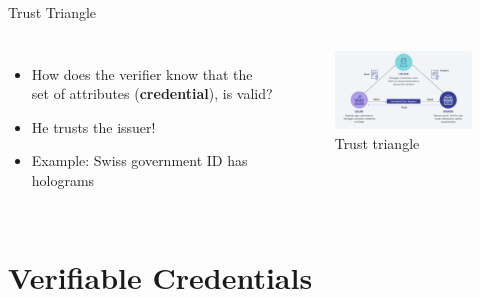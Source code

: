 \documentclass[
	english,%
	authorontitle=true,
	]{bfhbeamer}
\begin{document}
\begin{frame}{Trust Triangle}
    \begin{columns}[onlytextwidth,T]
        \column{70mm}  
        
        \begin{itemize}
            \item How does the verifier know that the set of attributes (\textbf{credential}), is valid?
            \item He trusts the issuer!
            \item Example: Swiss government ID has holograms
        \end{itemize}

        \column{70mm}

        \begin{figure}
            \centering
            \includegraphics[width=70mm]{./img/trusttriangle.png}
            \caption{Trust triangle}
        \end{figure}
        
    \end{columns}
\end{frame}

\section{Verifiable Credentials}
\end{document}
